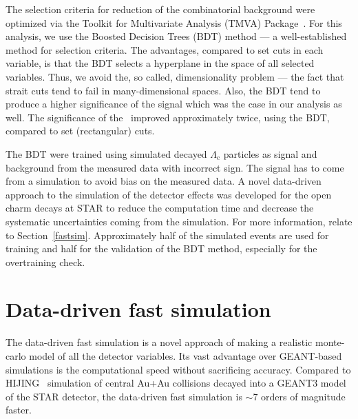 The selection criteria for reduction of the combinatorial background were optimized via the Toolkit for Multivariate Analysis (TMVA) Package~\cite{TMVA}. For this analysis, we use the Boosted Decision Trees (BDT) method --- a well-established method for selection criteria. The advantages, compared to set cuts in each variable, is that the BDT selects a hyperplane in the space of all selected variables. Thus, we avoid the, so called, dimensionality problem --- the fact that strait cuts tend to fail in many-dimensional spaces. Also, the BDT tend to produce a higher significance of the signal which was the case in our analysis as well. The significance of the \Lambdac\ improved approximately twice, using the BDT, compared to set (rectangular) cuts.




The BDT were trained using simulated decayed $\Lambda_\mathrm{c}$ particles as signal and background from the measured data with incorrect sign. The signal has to come from a simulation to avoid bias on the measured data. A novel data-driven approach to the simulation of the detector effects was developed for the open charm decays at STAR to reduce the computation time and decrease the systematic uncertainties coming from the simulation. For more information, relate to Section~\ref{fastsim}\@. Approximately half of the simulated events are used for training and half for the validation of the BDT method, especially for the overtraining check.




\section{Data-driven fast simulation\label{fastsim}}

The data-driven fast simulation is a novel approach of making a realistic monte-carlo model of all the detector variables. Its vast advantage over GEANT-based~\cite{GEANT} simulations is the computational speed without sacrificing accuracy. Compared to HIJING~\cite{HIJING} simulation of central Au+Au collisions decayed into a GEANT3 model of the STAR detector, the data-driven fast simulation is $\sim$7 orders of magnitude faster.

